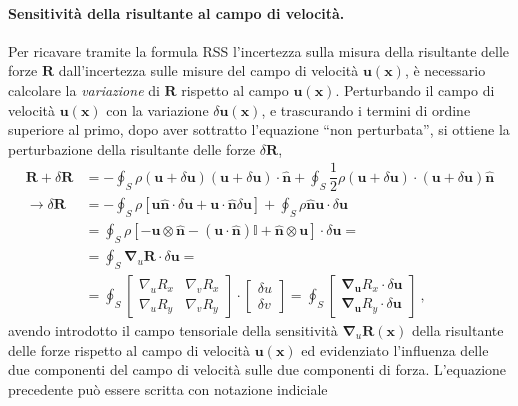 \paragraph{Sensitività della risultante al campo di velocità.}
Per ricavare tramite la formula RSS l'incertezza sulla misura della risultante delle forze $\bm{R}$ dall'incertezza sulle misure del campo di velocità $\bm{u}(\bm{x})$, è necessario calcolare la \textit{variazione} di $\bm{R}$ rispetto al campo $\bm{u}(\bm{x})$. Perturbando il campo di velocità $\bm{u}(\bm{x})$ con la variazione $\delta \bm{u}(\bm{x})$, e trascurando i termini di ordine superiore al primo, dopo aver sottratto l'equazione ``non perturbata'', si ottiene la perturbazione della risultante delle forze $\delta \bm{R}$,
\begin{equation}\label{eqn:sens:cont}
\begin{aligned}
  \bm{R} + \delta \bm{R} & = -\oint_S \rho (\bm{u}+\delta\bm{u}) (\bm{u}+\delta\bm{u}) \cdot \bm{\hat{n}} + \oint_S \dfrac{1}{2}\rho (\bm{u}+\delta\bm{u}) \cdot (\bm{u}+\delta\bm{u}) \bm{\hat{n} } \\
  \rightarrow \delta \bm{R} & = -\oint_S \rho \left[ \bm{u} \bm{\hat{n}} \cdot \delta\bm{u} + \bm{u} \cdot \bm{\hat{n}} \delta\bm{u}\right]  + \oint_S \rho \bm{\hat{n}} \bm{u} \cdot \delta\bm{u} \\
 & = \oint_S \rho \left[ - \bm{u} \otimes \bm{\hat{n}} - (\bm{u} \cdot \bm{\hat{n}})\mathbb{I} + \bm{\hat{n}} \otimes \bm{u} \right] \cdot \delta\bm{u} = \\
 & = \oint_S \bm{\nabla}_u \bm{R} \cdot \delta\bm{u} = \\
 & =\oint_S \begin{bmatrix} \nabla_u R_x &  \nabla_v R_x \\ \nabla_u R_y &  \nabla_v R_y  \end{bmatrix} \cdot \begin{bmatrix} \delta u \\ \delta v \end{bmatrix} =
 \oint_S \begin{bmatrix} \bm{\nabla}_{\bm{u}} R_x \cdot \delta \bm{u} \\ \bm{\nabla}_{\bm{u}} R_y \cdot \delta \bm{u} \end{bmatrix} \ ,
\end{aligned}
\end{equation}
avendo introdotto il campo tensoriale della sensitività $\bm{\nabla}_{u} \bm{R}(\bm{x})$ della risultante delle forze rispetto al campo di velocità $\bm{u}(\bm{x})$ ed evidenziato l'influenza delle due componenti del campo di velocità sulle due componenti di forza. L'equazione precedente può essere scritta con notazione indiciale
